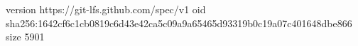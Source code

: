 version https://git-lfs.github.com/spec/v1
oid sha256:1642cf6c1cb0819c6d43e42ca5c09a9a65465d93319b0c19a07c401648dbe866
size 5901
